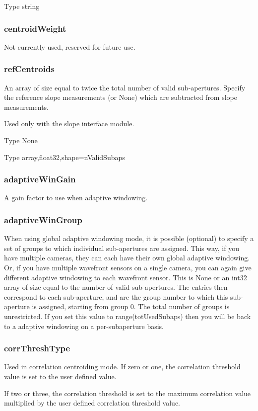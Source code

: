 \documentclass[a4,10pt]{article}
\begin{document}
Type string

\subsubsection{centroidWeight}
Not currently used, reserved for future use.


\subsubsection{refCentroids}
An array of size equal to twice the total number of valid sub-apertures.  Specify the
reference slope measurements (or None) which are subtracted from slope
measurements.

Used only with the slope interface module.

Type None 

Type array,float32,shape=nValidSubaps

\subsubsection{adaptiveWinGain}
A gain factor to use when adaptive windowing.


\subsubsection{adaptiveWinGroup}
When using global adaptive windowing mode, it is possible (optional)
to specify a set of groups to which individual sub-apertures are
assigned.  This way, if you have multiple cameras, they can each have
their own global adaptive windowing.  Or, if you have multiple
wavefront sensors on a single camera, you can again give different
adaptive windowing to each wavefront sensor.  This is None or an int32
array of size equal to the number of valid sub-apertures.  The entries
then correspond to each sub-aperture, and are the group number to
which this sub-aperture is assigned, starting from group 0.  The total
number of groups is unrestricted.  If you set this value to
range(totUsedSubaps) then you will be back to a adaptive windowing on a
per-subaperture basis.

\subsubsection{corrThreshType}
Used in correlation centroiding mode.
If zero or one, the correlation threshold value is set to
the user defined value.

If two or three, the correlation threshold is set to the maximum
correlation value multiplied by the user defined correlation threshold
value.
\end{document}
